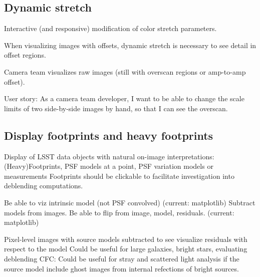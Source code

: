 \subsection{Dynamic stretch}

Interactive (and responsive) modification of color stretch parameters.

When visualizing images with offsets, dynamic stretch is necessary to see detail in offset regions.

Camera team visualizes raw images (still with overscan regions or amp-to-amp offset).

User story: As a camera team developer,  I want to be able to change the scale limits of two side-by-side images by hand, so that I can see the overscan.



\subsection{Display footprints and heavy footprints}

Display of LSST data objects with natural on-image interpretations: (Heavy)Footprints, PSF models at a point, PSF variation models or measurements
Footprints should be clickable to facilitate investigation into deblending computations.

Be able to viz intrinsic model (not PSF convolved) (current: matplotlib)
Subtract models from images. Be able to flip from image, model, residuals.   (current: matplotlib)

Pixel-level images with source models subtracted to see visualize residuals with respect to the model
Could be useful for large galaxies, bright stars, evaluating deblending
CFC: Could be useful for stray and scattered light analysis if the source model include ghost images from internal refections of bright sources.

